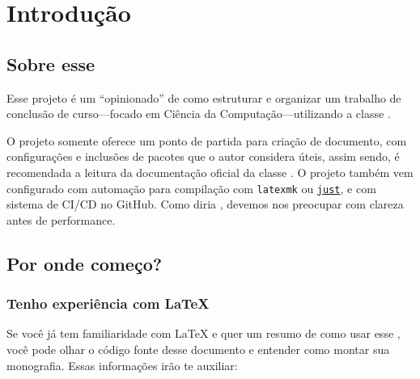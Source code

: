 \chapter{Introdução}

\section{Sobre esse \template}

Esse projeto é um \template{} \enquote{opinionado} de como estruturar e organizar um trabalho de conclusão de curso---focado em Ciência da Computação---utilizando a classe \href{https://www.ctan.org/pkg/abntex2}{\abntex}.

O projeto somente oferece um ponto de partida para criação de documento, com configurações e inclusões de pacotes que o autor considera úteis, assim sendo, é recomendada a leitura da documentação oficial da classe \abntex. O projeto também vem configurado com automação para compilação com \texttt{latexmk} ou \href{https://github.com/casey/just}{\texttt{just}}, e com sistema de CI/CD no GitHub. Como diria \textcite{knuth:goto:1974}, devemos nos preocupar com clareza antes de performance.

\section{Por onde começo?}

\subsection{Tenho experiência com \LaTeX{}} \label{sub:tenho-xp-com-latex}

Se você já tem familiaridade com \LaTeX{} e quer um resumo de como usar esse \template, você pode olhar o código fonte desse documento e entender como montar sua monografia. Essas informações irão te auxiliar:

